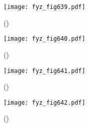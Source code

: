     \begin{figure}[ht!] %
      \centering
      \texttt{[image: fyz\_fig639.pdf]}
      \caption{
               (\cite[s.~707]{Feynman02})}
      \label{fyz:fig639}
    \end{figure}

    \begin{figure}[ht!] %
      \centering
      \texttt{[image: fyz\_fig640.pdf]}
      \caption{
               (\cite[s.~707]{Feynman02})}
      \label{fyz:fig640}
    \end{figure}

    \begin{figure}[ht!] %
      \centering
      \texttt{[image: fyz\_fig641.pdf]}
      \caption{
               (\cite[s.~707]{Feynman02})}
      \label{fyz:fig641}
    \end{figure}

    \begin{figure}[ht!] %
      \centering
      \texttt{[image: fyz\_fig642.pdf]}
      \caption{
               (\cite[s.~707]{Feynman02})}
      \label{fyz:fig642}
    \end{figure}

